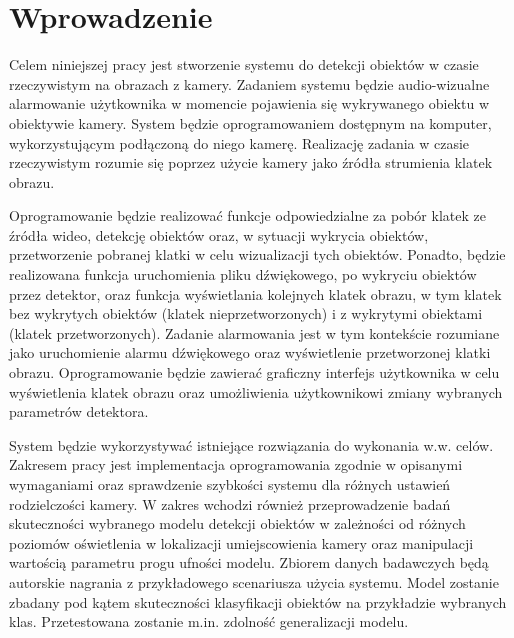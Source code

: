 \chapter{Wprowadzenie}


Celem niniejszej pracy jest stworzenie systemu do detekcji obiektów w czasie rzeczywistym na obrazach z kamery. Zadaniem systemu będzie audio-wizualne alarmowanie użytkownika w momencie pojawienia się wykrywanego obiektu w obiektywie kamery. System będzie oprogramowaniem dostępnym na komputer, wykorzystującym podłączoną do niego kamerę. Realizację zadania w czasie rzeczywistym rozumie się poprzez użycie kamery jako źródła strumienia klatek obrazu. 

Oprogramowanie będzie realizować funkcje odpowiedzialne za pobór klatek ze źródła wideo, detekcję obiektów oraz, w sytuacji wykrycia obiektów, przetworzenie pobranej klatki w celu wizualizacji tych obiektów. Ponadto, będzie realizowana funkcja uruchomienia pliku dźwiękowego, po wykryciu obiektów przez detektor, oraz funkcja wyświetlania kolejnych klatek obrazu, w tym klatek bez wykrytych obiektów (klatek nieprzetworzonych) i z wykrytymi obiektami (klatek przetworzonych). Zadanie alarmowania jest w tym kontekście rozumiane jako uruchomienie alarmu dźwiękowego oraz wyświetlenie przetworzonej klatki obrazu. Oprogramowanie będzie zawierać graficzny interfejs użytkownika w celu wyświetlenia klatek obrazu oraz umożliwienia użytkownikowi zmiany wybranych parametrów detektora.

System będzie wykorzystywać istniejące rozwiązania do wykonania w.w. celów. Zakresem pracy jest implementacja oprogramowania zgodnie w opisanymi wymaganiami oraz sprawdzenie szybkości systemu dla różnych ustawień rodzielczości kamery. 
W zakres wchodzi również przeprowadzenie badań skuteczności wybranego modelu detekcji obiektów w zależności od różnych poziomów oświetlenia w lokalizacji umiejscowienia kamery oraz manipulacji wartością parametru progu ufności modelu. Zbiorem danych badawczych będą autorskie nagrania z przykładowego scenariusza użycia systemu. Model zostanie zbadany pod kątem skuteczności klasyfikacji obiektów na przykładzie wybranych klas. Przetestowana zostanie m.in. zdolność generalizacji modelu.     